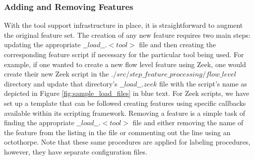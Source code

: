 \documentclass[sigconf]{acmart}
\begin{document}
\subsubsection{Adding and Removing Features}\label{subsubsec:adding_removing_features}
With the tool support infrastructure in place, it is straightforward to augment the original feature set.
The creation of any new feature requires two main steps:  updating the appropriate $\_\_load\_\_.<tool>$ file and then creating the corresponding feature script if necessary for the particular tool being used.
For example, if one wanted to create a new flow level feature using Zeek, one would create their new Zeek script in the $./src/step\_feature\_processing/flow\_level$ directory and update that directory's $\_\_load\_\_.zeek$ file with the script's name as depicted in Figure \ref{fig:sample_load_files} in blue text.
For Zeek scripts, we have set up a template that can be followed creating features using specific callbacks available within its scripting framework.
Removing a feature is a simple task of finding the appropriate $\_\_load\_\_.<tool>$ file and either removing the name of the feature from the listing in the file or commenting out the line using an octothorpe.
Note that these same procedures are applied for labeling procedures, however, they have separate configuration files.
\end{document}
